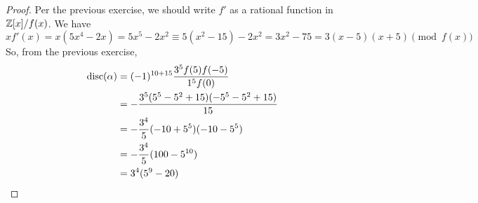 \begin{proof} 
    Per the previous exercise, we should write $f'$ as a rational function in $\mathbb{Z}[x]/f(x)$. We have
    \[ xf'(x) = x(5x^4-2x) = 5x^5-2x^2 \equiv 5(x^2-15)-2x^2 = 3x^2-75 = 3(x-5)(x+5) \pmod{f(x)} \]
    So, from the previous exercise,
    \begin{align*}
    \operatorname{disc}(\alpha)
        &= (-1)^{10+15}\frac{3^5f(5)f(-5)}{1^5f(0)} \\
        &= -\frac{3^5(5^5-5^2+15)(-5^5-5^2+15)}{15} \\
        &= -\frac{3^4}{5}(-10+5^5)(-10-5^5) \\
        &= -\frac{3^4}{5}(100-5^{10}) \\
        &= 3^4(5^9-20)
    \end{align*}
\end{proof}
